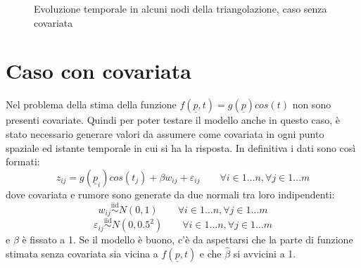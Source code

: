 \documentclass[a4paper,11pt,twoside,openright]{book}							%
\begin{document}
\begin{figure}[t]
	\centering
	\caption{Evoluzione temporale in alcuni nodi della triangolazione, caso senza covariata}
	\label{fig:DomC_ris2}
\end{figure}
\newpage
\section{Caso con covariata}

Nel problema della stima della funzione $f(\underline p,t)=g(\underline p)cos(t)$ non sono presenti covariate. Quindi per poter testare il modello anche in questo caso, è stato necessario generare valori da assumere come covariata in ogni punto spaziale ed istante temporale in cui si ha la risposta.
In definitiva i dati sono così formati:
$$
z_{ij}=g(\underline p_{i})cos(t_j) + \beta w_{ij} + \varepsilon_{ij} \qquad \forall i \in 1\ldots n, \forall j \in 1\ldots m
$$
dove covariata e rumore sono generate da due normali tra loro indipendenti:
$$
w_{ij}\stackrel{\mathrm{iid}}{\sim}N(0,1) \qquad \forall i \in 1\ldots n, \forall j \in 1\ldots m
$$
$$
\varepsilon_{ij}\stackrel{\mathrm{iid}}{\sim}N(0,0.5^2) \qquad \forall i \in 1\ldots n, \forall j \in 1\ldots m
$$
e $\beta$ è fissato a 1. Se il modello è buono, c'è da aspettarsi che la parte di funzione stimata senza covariata sia vicina a $f(\underline p,t)$ e che $\hat{\beta}$ si avvicini a 1.
 
\end{document}
